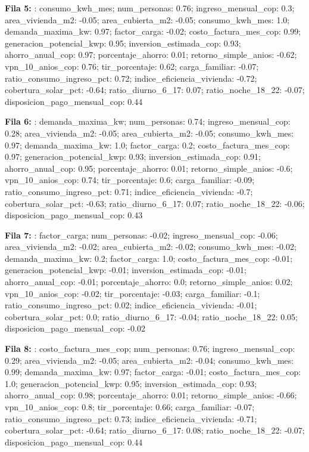 {\footnotesize\textbf{Fila 5:} : consumo\_kwh\_mes; num\_personas: 0.76; ingreso\_mensual\_cop: 0.3; area\_vivienda\_m2: -0.05; area\_cubierta\_m2: -0.05; consumo\_kwh\_mes: 1.0; demanda\_maxima\_kw: 0.97; factor\_carga: -0.02; costo\_factura\_mes\_cop: 0.99; generacion\_potencial\_kwp: 0.95; inversion\_estimada\_cop: 0.93; ahorro\_anual\_cop: 0.97; porcentaje\_ahorro: 0.01; retorno\_simple\_anios: -0.62; vpn\_10\_anios\_cop: 0.76; tir\_porcentaje: 0.62; carga\_familiar: -0.07; ratio\_consumo\_ingreso\_pct: 0.72; indice\_eficiencia\_vivienda: -0.72; cobertura\_solar\_pct: -0.64; ratio\_diurno\_6\_17: 0.07; ratio\_noche\_18\_22: -0.07; disposicion\_pago\_mensual\_cop: 0.44\par}
{\footnotesize\textbf{Fila 6:} : demanda\_maxima\_kw; num\_personas: 0.74; ingreso\_mensual\_cop: 0.28; area\_vivienda\_m2: -0.05; area\_cubierta\_m2: -0.05; consumo\_kwh\_mes: 0.97; demanda\_maxima\_kw: 1.0; factor\_carga: 0.2; costo\_factura\_mes\_cop: 0.97; generacion\_potencial\_kwp: 0.93; inversion\_estimada\_cop: 0.91; ahorro\_anual\_cop: 0.95; porcentaje\_ahorro: 0.01; retorno\_simple\_anios: -0.6; vpn\_10\_anios\_cop: 0.74; tir\_porcentaje: 0.6; carga\_familiar: -0.09; ratio\_consumo\_ingreso\_pct: 0.71; indice\_eficiencia\_vivienda: -0.7; cobertura\_solar\_pct: -0.63; ratio\_diurno\_6\_17: 0.07; ratio\_noche\_18\_22: -0.06; disposicion\_pago\_mensual\_cop: 0.43\par}
{\footnotesize\textbf{Fila 7:} : factor\_carga; num\_personas: -0.02; ingreso\_mensual\_cop: -0.06; area\_vivienda\_m2: -0.02; area\_cubierta\_m2: -0.02; consumo\_kwh\_mes: -0.02; demanda\_maxima\_kw: 0.2; factor\_carga: 1.0; costo\_factura\_mes\_cop: -0.01; generacion\_potencial\_kwp: -0.01; inversion\_estimada\_cop: -0.01; ahorro\_anual\_cop: -0.01; porcentaje\_ahorro: 0.0; retorno\_simple\_anios: 0.02; vpn\_10\_anios\_cop: -0.02; tir\_porcentaje: -0.03; carga\_familiar: -0.1; ratio\_consumo\_ingreso\_pct: 0.02; indice\_eficiencia\_vivienda: -0.01; cobertura\_solar\_pct: 0.0; ratio\_diurno\_6\_17: -0.04; ratio\_noche\_18\_22: 0.05; disposicion\_pago\_mensual\_cop: -0.02\par}
{\footnotesize\textbf{Fila 8:} : costo\_factura\_mes\_cop; num\_personas: 0.76; ingreso\_mensual\_cop: 0.29; area\_vivienda\_m2: -0.05; area\_cubierta\_m2: -0.04; consumo\_kwh\_mes: 0.99; demanda\_maxima\_kw: 0.97; factor\_carga: -0.01; costo\_factura\_mes\_cop: 1.0; generacion\_potencial\_kwp: 0.95; inversion\_estimada\_cop: 0.93; ahorro\_anual\_cop: 0.98; porcentaje\_ahorro: 0.01; retorno\_simple\_anios: -0.66; vpn\_10\_anios\_cop: 0.8; tir\_porcentaje: 0.66; carga\_familiar: -0.07; ratio\_consumo\_ingreso\_pct: 0.73; indice\_eficiencia\_vivienda: -0.71; cobertura\_solar\_pct: -0.64; ratio\_diurno\_6\_17: 0.08; ratio\_noche\_18\_22: -0.07; disposicion\_pago\_mensual\_cop: 0.44\par}
